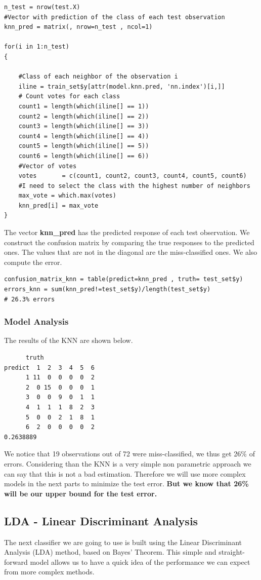 \documentclass[]{report}
\begin{document}
\begin{lstlisting}
n_test = nrow(test.X)
#Vector with prediction of the class of each test observation
knn_pred = matrix(, nrow=n_test , ncol=1) 

for(i in 1:n_test)
{

    #Class of each neighbor of the observation i
    iline = train_set$y[attr(model.knn.pred, 'nn.index')[i,]]
    # Count votes for each class
    count1 = length(which(iline[] == 1)) 
    count2 = length(which(iline[] == 2)) 
    count3 = length(which(iline[] == 3)) 
    count4 = length(which(iline[] == 4)) 
    count5 = length(which(iline[] == 5)) 
    count6 = length(which(iline[] == 6)) 
    #Vector of votes
    votes       = c(count1, count2, count3, count4, count5, count6)
    #I need to select the class with the highest number of neighbors
    max_vote = which.max(votes)
    knn_pred[i] = max_vote
}
\end{lstlisting}
The vector \textbf{knn\_pred} has the predicted response of each test observation. We construct the confusion matrix by comparing the true responses to the predicted ones. The values that are not in the diagonal are the miss-classified ones. We also compute the error.
\begin{lstlisting}
confusion_matrix_knn = table(predict=knn_pred , truth= test_set$y)
errors_knn = sum(knn_pred!=test_set$y)/length(test_set$y)
# 26.3% errors
\end{lstlisting}
\pagebreak
\subsubsection{Model Analysis}
The results of the KNN are shown below.
\begin{verbatim}
      truth
predict  1  2  3  4  5  6
      1 11  0  0  0  0  2
      2  0 15  0  0  0  1
      3  0  0  9  0  1  1
      4  1  1  1  8  2  3
      5  0  0  2  1  8  1
      6  2  0  0  0  0  2
0.2638889
\end{verbatim}
We notice that 19 observations out of 72 were miss-classified, we thus get 26\% of errors. Considering than the KNN is a very simple non parametric approach we can say that this is not a bad estimation. Therefore we will use more complex models in the next parts to minimize the test error. \textbf{But we know that 26\% will be our upper bound for the test error.}

\pagebreak

\subsection{LDA - Linear Discriminant Analysis}
The next classifier we are going to use is built using the Linear Discriminant Analysis (LDA) method, based on Bayes' Theorem. This simple and straight-forward model allows us to have a quick idea of the performance we can expect from more complex methods.  
\end{document}
